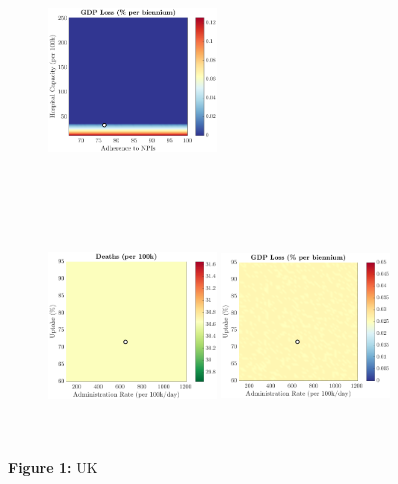 \documentclass[paper=a4, fontsize=11pt]{scrartcl}
\numberwithin{figure}{section}
\numberwithin{table}{section}
\begin{document}
\begin{figure}[H]
\begin{subfigure}[b]{\textwidth}
	\hspace{0.05cm}
    	\includegraphics[width=0.49\textwidth,height=6cm]{UK/SWINE/npl_g}
    \end{subfigure}
    \begin{subfigure}[b]{\textwidth}
      	\includegraphics[width=0.49\textwidth,height=6cm]{UK/SWINE/imm_d}
	\hspace{0.05cm}
    	\includegraphics[width=0.49\textwidth,height=6cm]{UK/SWINE/imm_g}
    \end{subfigure}
\caption*{\textbf{Figure 1:} UK} 
\end{figure}
\end{document}
